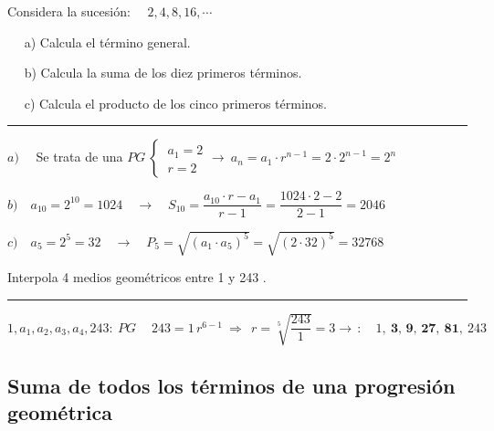 \vspace{5mm}

\begin{miejercicio}

Considera la sucesión: $\quad 2,4,8,16,\cdots$

$\quad$ a) Calcula el término general.

$\quad$ b) Calcula la suma de los diez primeros términos.

$\quad$ c) Calcula el producto de los cinco primeros términos.

\rule{250pt}{0.1pt}
\vspace{2mm}

$a)\quad $ Se trata de una $PG \ \begin{cases} \ a_1=2\\\ r=2 \end{cases} \to \ a_n=a_1\cdot r^{n-1}=2\cdot 2^{n-1}=2^n$

\vspace{2mm} $b)\quad a_{10}=2^{10}=1024 \quad \to \quad S_{10}=\dfrac{a_{10}\cdot r-a_1}{r-1}=\dfrac{1024\cdot 2-2}{2-1}=2046$

\vspace{2mm} $c)\quad a_5=2^5=32 \quad \to \quad P_5=\sqrt{(a_1\cdot a_5)^5}=\sqrt{(2\cdot 32)^5}=32768$
	
\end{miejercicio}

\begin{miejercicio}

Interpola 4 medios geométricos entre 1 y 243	.

\rule{250pt}{0.1pt}
\vspace{2mm}

$1, a_1, a_2, a_3, a_4, 243:\ PG \ \quad 243=1\, r^{6-1} \ \Rightarrow \ \  r=\sqrt[5]{\dfrac {243}{1}}=3 \to \, : \quad 1,\ \boldsymbol{3,\, 9,\, 27,\ 81,\ } 243$
\end{miejercicio}



\subsection{Suma de todos los términos de una progresión geométrica}
\vspace{0.5cm}

